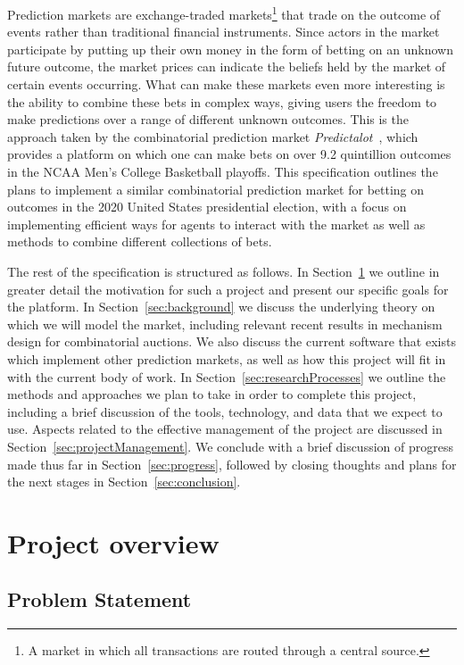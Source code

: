 \documentclass[10pt,a4paper]{article}
\theoremstyle{plain}
\theoremstyle{definition}
\begin{document}
	Prediction markets are exchange-traded markets\footnote{A market in which
	all transactions are routed through a central source.} that trade on the
	outcome of events rather than traditional financial instruments. Since
	actors in the market participate by putting up their own money in the form
	of betting on an unknown future outcome, the market prices can indicate the
	beliefs held by the market of certain events occurring. What can make these
	markets even more interesting is the ability to combine these bets in
	complex ways, giving users the freedom to make predictions over a range of
	different unknown outcomes. This is the approach taken by the combinatorial
	prediction market \emph{Predictalot}~\cite{Predictalot}, which provides a
	platform on which one can make bets on over 9.2 quintillion outcomes in the
	NCAA Men's College Basketball playoffs. This specification outlines the
	plans to implement a similar combinatorial prediction market for betting on
	outcomes in the 2020 United States presidential election, with a focus on
	implementing efficient ways for agents to interact with the market as well
	as methods to combine different collections of bets.

	The rest of the specification is structured as follows. In
	Section~\ref{sec:overview} we outline in greater detail the motivation for
	such a project and present our specific goals for the platform. In
	Section~\ref{sec:background} we discuss the underlying theory on which we
	will model the market, including relevant recent results in mechanism
	design for combinatorial auctions. We also discuss the current software
	that exists which implement other prediction markets, as well
	as how this project will fit in with the current body of work. In
	Section~\ref{sec:researchProcesses} we outline the methods and approaches
	we plan to take in order to complete this project, including a brief
	discussion of the tools, technology, and data that we expect to use. Aspects
	related to the effective management of the project are discussed in
	Section~\ref{sec:projectManagement}. We conclude with a brief discussion of
	progress made thus far in Section~\ref{sec:progress}, followed by closing
	thoughts and plans for the next stages in Section~\ref{sec:conclusion}.

\section{Project overview}
	\label{sec:overview}

	\subsection{Problem Statement}
\end{document}
